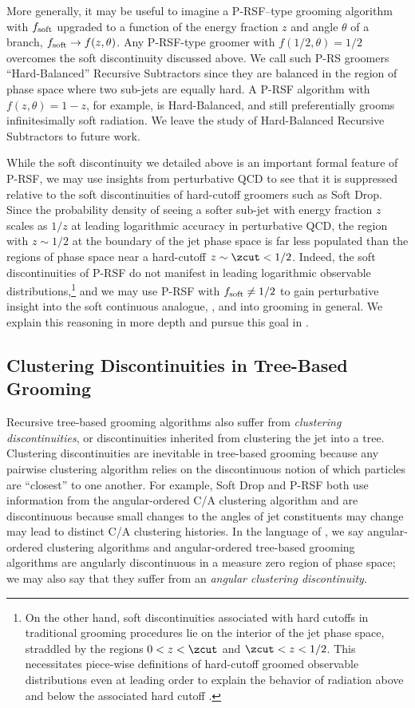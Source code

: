 \documentclass[letterpaper,11pt]{article}
\begin{document}
More generally, it may be useful to imagine a P-RSF--type grooming algorithm with \(f_{\rm soft}\) upgraded to a function of the energy fraction \(z\) and angle \(\theta\) of a branch, \(f_{\rm soft} \to f(z,\theta)\).
%
Any P-RSF-type groomer with \(f(1/2, \theta) = 1/2\) overcomes the soft discontinuity discussed above.
%
We call such P-RS groomers ``Hard-Balanced'' Recursive Subtractors since they are balanced in the region of phase space where two sub-jets are equally hard.
%
A P-RSF algorithm with \(f(z, \theta) = 1 - z\), for example, is Hard-Balanced, and still preferentially grooms infinitesimally soft radiation.
%
We leave the study of Hard-Balanced Recursive Subtractors to future work.

While the soft discontinuity we detailed above is an important formal feature of P-RSF, we may use insights from perturbative QCD to see that it is suppressed relative to the soft discontinuities of hard-cutoff groomers such as Soft Drop.
%
Since the probability density of seeing a softer sub-jet with energy fraction \(z\) scales as \(1/z\) at leading logarithmic accuracy in perturbative QCD, the region with \(z \sim 1/2\) at the boundary of the jet phase space is far less populated than the regions of phase space near a hard-cutoff \(z \sim \zcut < 1/2\).
%
Indeed, the soft discontinuities of P-RSF do not manifest in leading logarithmic observable distributions,\footnote{
On the other hand, soft discontinuities associated with hard cutoffs in traditional grooming procedures lie on the interior of the jet phase space, straddled by the regions \(0 < z < \zcut\) and \(\zcut < z < 1/2\).
%
This necessitates piece-wise definitions of hard-cutoff groomed observable distributions even at leading order to explain the behavior of radiation above and below the associated hard cutoff \cite{Larkoski:2014wba}.
} and we may use P-RSF with \(f_{\rm soft} \neq 1/2\) to gain perturbative insight into the soft continuous analogue, , and into \PIRANHA{} grooming in general.
%
We explain this reasoning in more depth and pursue this goal in .


\subsection{Clustering Discontinuities in Tree-Based Grooming}
\label{sec:ang_discont}

Recursive tree-based grooming algorithms also suffer from \textit{clustering discontinuities}, or discontinuities inherited from clustering the jet into a tree.
%
Clustering discontinuities are inevitable in tree-based grooming because any pairwise clustering algorithm relies on the discontinuous notion of which particles are ``closest'' to one another.
%
For example, Soft Drop and P-RSF both use information from the angular-ordered C/A clustering algorithm and are discontinuous because small changes to the angles of jet constituents may change may lead to distinct C/A clustering histories.
%
In the language of , we say angular-ordered clustering algorithms and angular-ordered tree-based grooming algorithms are angularly discontinuous in a measure zero region of phase space;
%
we may also say that they suffer from an \textit{angular clustering discontinuity}.
\end{document}
